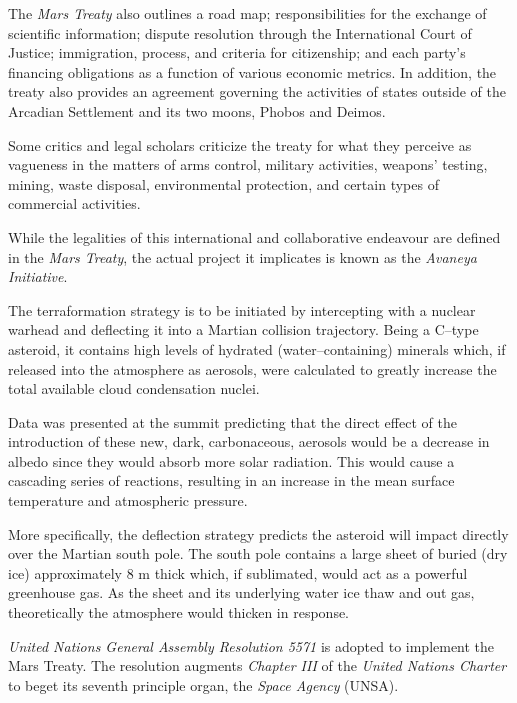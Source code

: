 The {\it Mars Treaty} also outlines a road map; responsibilities for the exchange of scientific information; dispute resolution through the International Court of Justice; immigration, process, and criteria for citizenship; and each party's financing obligations as a function of various economic metrics. In addition, the treaty also provides an agreement governing the activities of states outside of the Arcadian Settlement and its two moons, Phobos and Deimos. 

Some critics and legal scholars criticize the treaty for what they perceive as vagueness in the matters of arms control, military activities, weapons' testing, mining, waste disposal, environmental protection, and certain types of commercial activities.

While the legalities of this international and collaborative endeavour are defined in the {\it Mars Treaty}, the actual project it implicates is known as the {\it Avaneya Initiative}.

The terraformation strategy is to be initiated by intercepting  with a nuclear warhead and deflecting it into a Martian collision trajectory. Being a C--type asteroid, it contains high levels of hydrated (water--containing) minerals which, if released into the atmosphere as aerosols, were calculated to greatly increase the total available cloud condensation nuclei.

Data was presented at the summit predicting that the direct effect of the introduction of these new, dark, carbonaceous, aerosols would be a decrease in albedo since they would absorb more solar radiation. This would cause a cascading series of reactions, resulting in an increase in the mean surface temperature and atmospheric pressure.

More specifically, the deflection strategy predicts the asteroid will impact directly over the Martian south pole. The south pole contains a large sheet of buried  (dry ice) approximately 8 m thick which, if sublimated, would act as a powerful greenhouse gas. As the sheet and its underlying water ice thaw and out gas, theoretically the atmosphere would thicken in response.
\StopTimelineDate

{\it United Nations General Assembly Resolution 5571} is adopted to implement the Mars Treaty. The resolution augments {\it Chapter III} of the {\it United Nations Charter} to beget its seventh principle organ, the {\it Space Agency} (UNSA).

